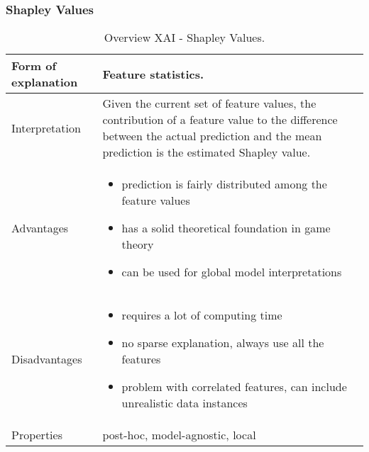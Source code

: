 \subsubsection{Shapley Values}
\begin{table}[H]
  \centering
  \begin{tabular}{|p{}|p{}|}
    \hline
    Form of \newline explanation & 
    Feature statistics. \\
    
    \hline
    Interpretation & 
    Given the current set of feature values, the contribution of a feature value to the difference between the actual prediction and the mean prediction is the estimated Shapley value. \\
    \hline
    Advantages &
    \begin{itemize}[nosep, left=0em]
        \item prediction is fairly distributed among the feature values
        \item has a solid theoretical foundation in game theory
        \item can be used for global model interpretations
    \end{itemize} \\
    
    \hline
    Disadvantages &
    \begin{itemize}[nosep, left=0em]
        \item requires a lot of computing time
        \item no sparse explanation, always use all the features
        \item problem with correlated features, can include unrealistic data instances
    \end{itemize} \\
    
    \hline
    Properties & 
    post-hoc, model-agnostic, local  \\
    
    \hline
  \end{tabular}
  \caption{Overview XAI - Shapley Values.}
\end{table}

